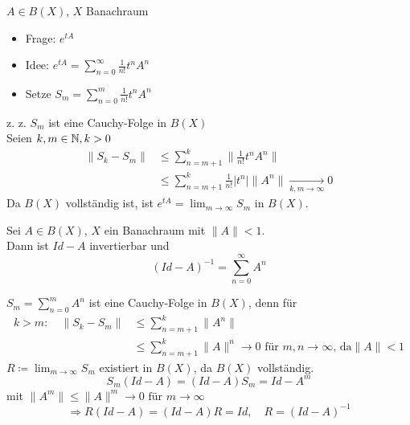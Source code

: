 \begin{bemerkung}[Exponentialfunktion]
	$A \in B(X)$, $X$ Banachraum
	\begin{itemize}
		\item Frage: $e^{tA}$
		\item Idee: $e^{tA} = \sum_{n = 0}^{\infty} \frac{1}{n!} t^{n} A^{n}$
		\item Setze $S_{m} = \sum_{n = 0}^{m}	 \frac{1}{n!} t^{n} A^{n}$
	\end{itemize}
	z. z. $S_{m}$ ist eine Cauchy-Folge in $B(X)$ \\
	Seien $k, m \in \mathbb{N}, k > 0$
	\begin{align*}
		\| S_{k} - S_{m} \| & \leq \sum_{n = m +1}^{k} \| \frac{1}{n!} t^{n} A^{n} \| \\
			& \leq \sum_{n = m +1}^{k}  \frac{1}{n!} | t^{n} | \| A^{n} \| \xrightarrow[k, m \rightarrow \infty]{} 0
	\end{align*}
	Da $B(X)$ vollständig ist, ist $e^{tA} = \lim_{m \rightarrow \infty} S_{m}$ in $B(X)$.
\end{bemerkung}


\begin{prop} \label{prop:5.8-NeumannscheReihe}
	Sei $A \in B(X)$, $X$ ein Banachraum mit $\| A \| < 1$. \\
	Dann ist $Id - A$ invertierbar und 
	\[ \left( Id - A \right)^{-1} = \sum_{n = 0}^{\infty} A^{n} \]
	\begin{beweis}
		$S_{m} = \sum_{n = 0}^{m} A^{n}$ ist eine Cauchy-Folge in $B(X)$, denn für
		\begin{align*}
		k > m: \quad \| S_{k} - S_{m} \| & \leq \sum_{n = m + 1}^{k} \| A^{n} \| \\
			& \leq \sum_{n = m + 1}^{k} \| A \|^{n} \rightarrow 0 \text{ für } m, n \rightarrow \infty \text{, da} \| A \| < 1
		\end{align*}
		$R \coloneqq \lim_{m \rightarrow \infty} S_{m}$ existiert in $B(X)$, da $B(X)$ vollständig.
		\[ S_{m} (Id - A) = (Id - A) S_{m} = Id - A^{m} \]
		mit $\| A^{m} \| \leq \| A \|^{m} \rightarrow 0 \text{ für } m \rightarrow \infty$
		\[ \Rightarrow R (Id - A) = (Id - A) R = Id, \quad R = (Id - A)^{-1} \]
	\end{beweis}
\end{prop}


